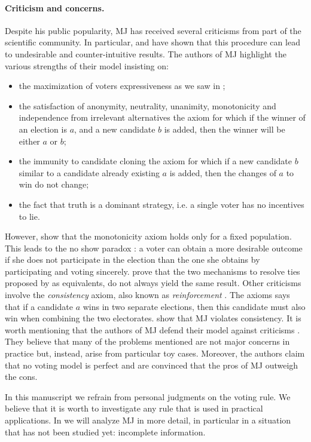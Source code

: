\paragraph{Criticism and concerns.}
Despite his public popularity, \ac{MJ} has received several criticisms from part of the scientific community. In particular, \citet{Felsenthal2008, Zahid2009} and \citet{Laslier2018} have shown that this procedure can lead to undesirable and counter-intuitive results.
The authors of \ac{MJ} highlight the various strengths of their model insisting on:
\begin{itemize}
	\item the maximization of voters expressiveness \textemdash as we saw in ;
	\item the satisfaction of anonymity, neutrality, unanimity, monotonicity and independence from irrelevant alternatives \textemdash the axiom for which if the winner of an election is $a$, and a new candidate $b$ is added, then the winner will be either $a$ or $b$;
	\item the immunity to candidate cloning \textemdash the axiom for which if a new candidate $b$ similar to a candidate already existing $a$ is added, then the changes of $a$ to win do not change;
	\item the fact that truth is a dominant strategy, i.e. a single voter has no incentives to lie.
\end{itemize}

However, \citet{Felsenthal2008,Laslier2018} show that the monotonicity axiom holds only for a fixed population. This leads to the no show paradox \citep{Fishburn1983}: a voter can obtain a more desirable outcome if she does not participate in the election than the one she obtains by participating and voting sincerely. 
\citet{Felsenthal2008,Zahid2009} prove that the two mechanisms to resolve ties proposed by \citet{Balinski2011} as equivalents, do not always yield the same result. 
Other criticisms involve the \textit{consistency} axiom, also known as \textit{reinforcement} \citep{Young1974,Young1975}. The axioms says that if a candidate $a$ wins in two separate elections, then this candidate must also win when combining the two electorates. \citet{Felsenthal2008} show that \ac{MJ} violates consistency.
It is worth mentioning that the authors of \ac{MJ} defend their model against criticisms \citep{Balinski2011,Balinski2019}. They believe that many of the problems mentioned are not major concerns in practice but, instead, arise from particular toy cases. Moreover, the authors claim that no voting model is perfect and are convinced that the pros of MJ outweigh the cons.

In this manuscript we refrain from personal judgments on the voting rule. We believe that it is worth to investigate any rule that is used in practical applications. In  we will analyze \ac{MJ} in more detail, in particular in a situation that has not been studied yet: incomplete information.










